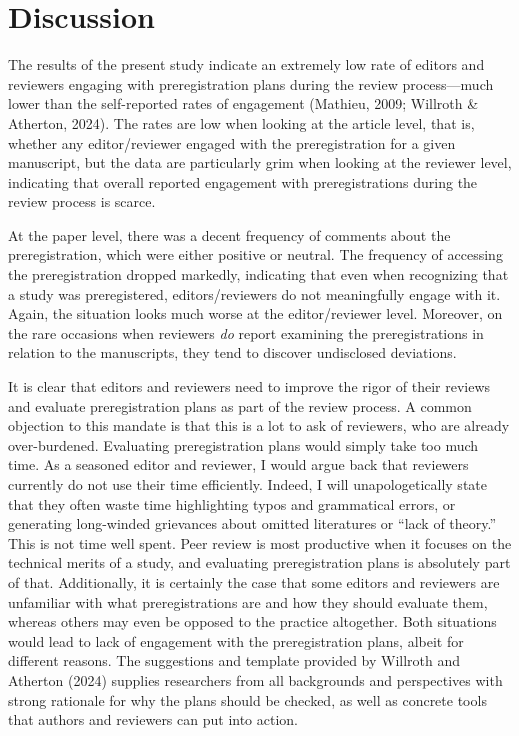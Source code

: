 \documentclass[authordate, meta]{jote-new-article}
\begin{document}
	\section{Discussion}



	The results of the present study indicate an extremely low rate of editors and reviewers engaging with preregistration plans during the review process—much lower than the self-reported rates of engagement (Mathieu, 2009; Willroth \& Atherton, 2024). The rates are low when looking at the article level, that is, whether any editor/reviewer engaged with the preregistration for a given manuscript, but the data are particularly grim when looking at the reviewer level, indicating that overall reported engagement with preregistrations during the review process is scarce.



	At the paper level, there was a decent frequency of comments about the preregistration, which were either positive or neutral. The frequency of accessing the preregistration dropped markedly, indicating that even when recognizing that a study was preregistered, editors/reviewers do not meaningfully engage with it. Again, the situation looks much worse at the editor/reviewer level. Moreover, on the rare occasions when reviewers \emph{do} report examining the preregistrations in relation to the manuscripts, they tend to discover undisclosed deviations.



	It is clear that editors and reviewers need to improve the rigor of their reviews and evaluate preregistration plans as part of the review process. A common objection to this mandate is that this is a lot to ask of reviewers, who are already over-burdened. Evaluating preregistration plans would simply take too much time. As a seasoned editor and reviewer, I would argue back that reviewers currently do not use their time efficiently. Indeed, I will unapologetically state that they often waste time highlighting typos and grammatical errors, or generating long-winded grievances about omitted literatures or “lack of theory.” This is not time well spent. Peer review is most productive when it focuses on the technical merits of a study, and evaluating preregistration plans is absolutely part of that. Additionally, it is certainly the case that some editors and reviewers are unfamiliar with what preregistrations are and how they should evaluate them, whereas others may even be opposed to the practice altogether. Both situations would lead to lack of engagement with the preregistration plans, albeit for different reasons. The suggestions and template provided by Willroth and Atherton (2024) supplies researchers from all backgrounds and perspectives with strong rationale for why the plans should be checked, as well as concrete tools that authors and reviewers can put into action.
\end{document}
